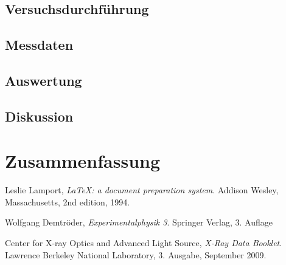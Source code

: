 \documentclass[10pt, a4paper]{article}
\begin{document}
\subsection{Versuchsdurchführung}
\subsection{Messdaten}
\subsection{Auswertung}
\subsection{Diskussion}


\section{Zusammenfassung}

\begin{figure}
\centering

\end{figure}

\begin{figure}
\centering

\end{figure}


\begin{thebibliography}{9}

  Leslie Lamport,
  \emph{\LaTeX: a document preparation system}.
  Addison Wesley, Massachusetts,
  2nd edition,
  1994.

	Wolfgang Demtröder,
	\emph{Experimentalphysik 3}.
	Springer Verlag,
	3. Auflage

  Center for X-ray Optics and Advanced Light Source,
  \emph{X-Ray Data Booklet}.
  Lawrence Berkeley National Laboratory,
  3. Ausgabe,
  September 2009.
\end{thebibliography}

\newpage

\begin{appendix}

\end{appendix}
\end{document}
